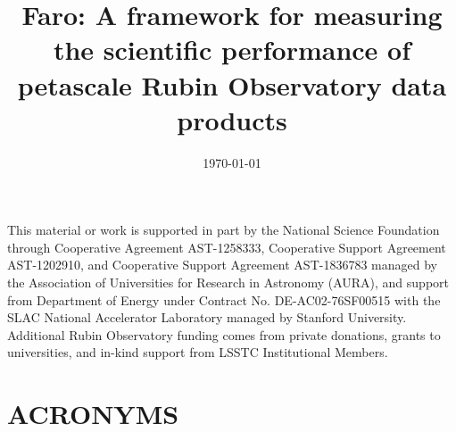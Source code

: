 \documentclass[]{spie}
\title{Faro: A framework for measuring the scientific performance of petascale Rubin Observatory data products}
\date{\today}
\def\acronyms{\section*{ACRONYMS}\label{sec:acronyms}}
\begin{document}
\maketitle



\newpage
\listoftodos
\newpage



\appendix
%

\acknowledgments

This material or work is supported in part by the National Science Foundation through Cooperative Agreement AST-1258333, Cooperative Support Agreement AST-1202910, and Cooperative Support Agreement AST-1836783 managed by the Association of Universities for Research in Astronomy (AURA), and support from Department of Energy under Contract No. DE-AC02-76SF00515 with the SLAC National Accelerator Laboratory managed by Stanford University. 
Additional Rubin Observatory funding comes from private donations, grants to universities, and in-kind support from LSSTC Institutional Members.
	



\acronyms 

\end{document}
